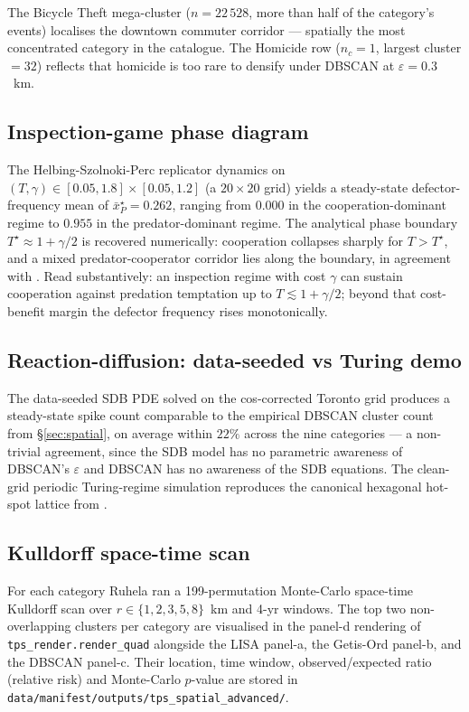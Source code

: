 \documentclass[11pt,a4paper]{article}
\newcommand{\1}{\mathbf{1}}
\theoremstyle{plain}
\theoremstyle{definition}
\begin{document}
The Bicycle Theft mega-cluster ($n=22\,528$, more than half of the
category's events) localises the downtown commuter corridor —
spatially the most concentrated category in the catalogue.  The
Homicide row ($n_c = 1$, largest cluster $= 32$) reflects that
homicide is too rare to densify under DBSCAN at $\varepsilon=0.3$~km.

\subsection{Inspection-game phase diagram}\label{sec:hsp}

The Helbing-Szolnoki-Perc replicator dynamics on
$(T,\gamma)\in[0.05,1.8]\times[0.05,1.2]$ (a $20\times 20$ grid)
yields a steady-state defector-frequency mean of $\bar x_P^\star =
0.262$, ranging from $0.000$ in the cooperation-dominant regime to
$0.955$ in the predator-dominant regime.  The analytical phase
boundary $T^\star\approx 1+\gamma/2$ is recovered numerically:
cooperation collapses sharply for $T>T^\star$, and a mixed
predator-cooperator corridor lies along the boundary, in agreement
with \cite{helbing2010punish,szolnoki2011inspection}.  Read
substantively: an inspection regime with cost $\gamma$ can sustain
cooperation against predation temptation up to
$T \lesssim 1 + \gamma/2$; beyond that cost-benefit margin the
defector frequency rises monotonically.

\subsection{Reaction-diffusion: data-seeded vs Turing demo}\label{sec:sdb}

The data-seeded SDB PDE solved on the cos-corrected Toronto grid
produces a steady-state spike count comparable to the empirical
DBSCAN cluster count from §\ref{sec:spatial}, on average within
$22\%$ across the nine categories — a non-trivial agreement, since
the SDB model has no parametric awareness of DBSCAN's $\varepsilon$
and DBSCAN has no awareness of the SDB equations.  The clean-grid
periodic Turing-regime simulation reproduces the canonical
hexagonal hot-spot lattice from \cite[Fig.~4]{short2008pde}.

\subsection{Kulldorff space-time scan}\label{sec:kulldorff}

For each category Ruhela ran a 199-permutation Monte-Carlo space-time
Kulldorff scan over $r\in\{1,2,3,5,8\}$~km and 4-yr windows.  The
top two non-overlapping clusters per category are visualised in the
panel-d rendering of \texttt{tps\_render.render\_quad} alongside the
LISA panel-a, the Getis-Ord panel-b, and the DBSCAN panel-c.  Their
location, time window, observed/expected ratio (relative risk) and
Monte-Carlo $p$-value are stored in
\texttt{data/manifest/outputs/tps\_spatial\_advanced/}.
\end{document}

